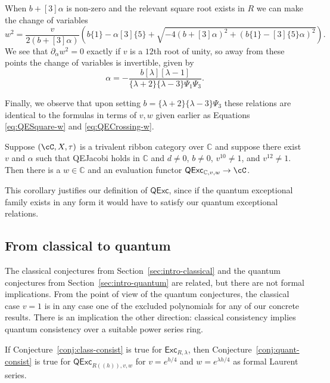 \documentclass[12pt]{amsart}
\begin{document}
When $b+[3]\alpha$ is non-zero and the relevant square root exists in $R$ we can make the change of variables
\begin{equation}\label{eq:change-variables}
  w^2 = \frac{v}{2(b+[3]\alpha)}\left(b \{1\} -\alpha [3] \{5\} + \sqrt{-4 (b+[3]\alpha)^2 + (b \{1\} -[3]\{5\}\alpha)^2} \right).
\end{equation}
We see that $\partial_\alpha w^2 = 0$ exactly if $v$ is a $12$th root of
unity, so away from these points the change of variables is invertible, given
by
$$\alpha =  -\frac{b[\lambda][\lambda-1]}{\{\lambda+2\}\{\lambda-3\}\Psi_1\Psi_3}.$$

Finally, we observe that upon setting $b =
\{\lambda+2\}\{\lambda-3\}\Psi_3$ these relations are identical to
the formulas in terms of $v,w$ given earlier as Equations
\eqref{eq:QESquare-w} and \eqref{eq:QECrossing-w}.

\begin{corollary}
Suppose $(\cC, X, \tau)$ is a trivalent ribbon category over $\mathbb{C}$ and
suppose there exist $v$ and $\alpha$ such that QEJacobi holds in $\mathbb{C}$
and $d \neq 0 $, $b \neq 0$, $v^{10} \neq 1$, and $v^{12} \neq 1$.  Then there
is a $w \in \mathbb{C}$ and an evaluation functor
$\mathsf{QExc}_{\mathbb{C},v,w} \rightarrow \cC$.
\end{corollary}

This corollary justifies our definition of $\mathsf{QExc}$, since if the
quantum exceptional family exists in any form it would have to satisfy our
quantum exceptional relations.

\subsection{From classical to quantum}
The classical conjectures from Section~\ref{sec:intro-classical} and
the quantum conjectures from Section~\ref{sec:intro-quantum} are
related, but there are not formal implications. From the point of view
of the quantum conjectures, the classical case $v=1$ is in any case
one of the excluded polynomials for any of our concrete results. There
is an implication the other direction: classical consistency implies
quantum consistency over a suitable power series ring.
\begin{theorem}\label{thm:classical-quantum}
  If Conjecture~\ref{conj:class-consist} is true
  for $\mathsf{Exc}_{R,\lambda}$, then
  Conjecture~\ref{conj:quant-consist} is true for
  $\mathsf{QExc}_{R((h)),v,w}$ for $v=e^{h/4}$ and $w=e^{\lambda
    h/4}$ as formal Laurent series.
\end{theorem}
\end{document}

